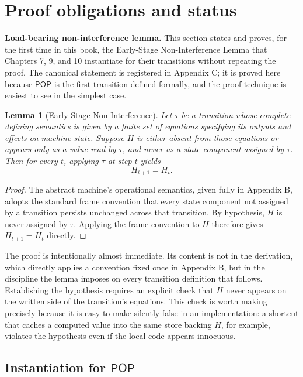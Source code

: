 \documentclass[11pt,openany]{book}
\newtheorem{lemma}[definition]{Lemma}
\newcommand{\Pop}{\mathsf{POP}}
\begin{document}
\section{Proof obligations and status}

\textbf{Load-bearing non-interference lemma.} This section states and proves,
for the first time in this book, the Early-Stage Non-Interference Lemma that
Chapters 7, 9, and 10 instantiate for their transitions without repeating the
proof. The canonical statement is registered in Appendix C; it is proved here
because \(\Pop\) is the first transition defined formally, and the proof
technique is easiest to see in the simplest case.

\begin{lemma}[Early-Stage Non-Interference]
Let \(\tau\) be a transition whose complete defining semantics is given by a
finite set of equations specifying its outputs and effects on machine state.
Suppose \(H\) is either absent from those equations or appears only as a value
read by \(\tau\), and never as a state component assigned by \(\tau\). Then
for every \(t\), applying \(\tau\) at step \(t\) yields
\[
 H_{t+1}=H_t.
\]
\end{lemma}

\begin{proof}
The abstract machine's operational semantics, given fully in Appendix B,
adopts the standard frame convention that every state component not assigned
by a transition persists unchanged across that transition. By hypothesis,
\(H\) is never assigned by \(\tau\). Applying the frame convention to \(H\)
therefore gives \(H_{t+1}=H_t\) directly.
\end{proof}

The proof is intentionally almost immediate. Its content is not in the
derivation, which directly applies a convention fixed once in Appendix B, but
in the discipline the lemma imposes on every transition definition that
follows. Establishing the hypothesis requires an explicit check that \(H\)
never appears on the written side of the transition's equations. This check is
worth making precisely because it is easy to make silently false in an
implementation: a shortcut that caches a computed value into the same store
backing \(H\), for example, violates the hypothesis even if the local code
appears innocuous.

\subsection{Instantiation for \texorpdfstring{\(\Pop\)}{POP}}
\end{document}
